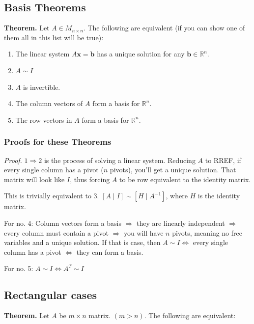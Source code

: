 \documentclass[
]{article}
\begin{document}
\subsection{Basis Theorems}

\textbf{Theorem.} Let $A \in M_{n \times n}$. The following are
equivalent (if you can show one of them all in this list will be true):

\begin{enumerate}
\def\labelenumi{\arabic{enumi}.}
\item
  The linear system $A\mathbf{x} = \mathbf{b}$ has a unique
  solution for any $\mathbf{b} \in \mathbb{R}^{n}$.
\item
  $A\sim I$
\item
  $A$ is invertible.
\item
  The column vectors of $A$ form a basis for $\mathbb{R}^{n}$.
\item
  The row vectors in $A$ form a basis for $\mathbb{R}^{n}$.
\end{enumerate}


\subsubsection{Proofs for these
Theorems}

\emph{Proof.} $1 \Rightarrow 2$ is the process of solving a linear
system. Reducing $A$ to RREF, if every single column has a pivot
($n$ pivots), you'll get a unique solution. That matrix will look like
$I$, thus forcing $A$ to be row equivalent to the identity matrix.

This is trivially equivalent to $3$.
$\left\lbrack A\mid I \right\rbrack\sim\left\lbrack H\mid A^{- 1} \right\rbrack$,
where $H$ is the identity matrix.

For no. 4: Column vectors form a basis $\Rightarrow$ they are linearly
independent $\Rightarrow$ every column must contain a pivot
$\Rightarrow$ you will have $n$ pivots, meaning no free variables
and a unique solution. If that is case, then $A\sim I \Leftrightarrow$
every single column has a pivot $\Leftrightarrow$ they can form a
basis.

For no. 5: $A\sim I \Leftrightarrow A^{T}\sim I$


\subsection{Rectangular cases}

\textbf{Theorem.} Let $A$ be $m \times n$ matrix. $(m > n)$. The
following are equivalent:
\end{document}
